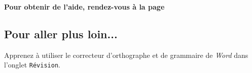 \vfill
\phantom{rien}

\begin{center}\label{modelePage5e1}\end{center}

\textbf{Pour obtenir de l'aide, rendez-vous à la page \pageref{aide_seancesWord}}

\subsection{Pour aller plus loin...}

Apprenez à utiliser le correcteur d'orthographe et de grammaire de \emph{Word} dans l'onglet \texttt{Révision}.










